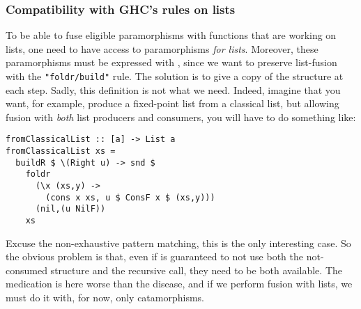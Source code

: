 \subsubsection{Compatibility with GHC's rules on lists}
\label{sec:parabuild}
To be able to fuse eligible paramorphisms with functions that are working on lists, one need to have access to paramorphisms \emph{for lists}. Moreover, these paramorphisms must be expressed with , since we want to preserve list-fusion with the \verb|"foldr/build"| rule. The solution is to give a copy of the structure at each step. Sadly, this definition is not what we need. Indeed, imagine that you want, for example, produce a fixed-point list from a classical list, but allowing fusion with \emph{both} list producers and  consumers, you will have to do something like:
\begin{verbatim}
fromClassicalList :: [a] -> List a
fromClassicalList xs = 
  buildR $ \(Right u) -> snd $
    foldr 
      (\x (xs,y) -> 
        (cons x xs, u $ ConsF x $ (xs,y)))
      (nil,(u NilF))
    xs
\end{verbatim}
Excuse the non-exhaustive pattern matching, this is the only interesting case. So the obvious problem is that, even if  is guaranteed to not use both the not-consumed structure and the recursive call, they need to be both available. The medication is here worse than the disease, and if we perform fusion with lists, we must do it with, for now, only catamorphisms.


